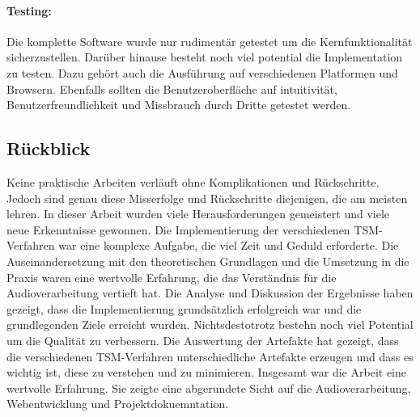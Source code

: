 \paragraph{Testing:}
Die komplette Software wurde nur rudimentär getestet um die Kernfunktionalität sicherzustellen. Darüber hinause besteht noch viel potential die Implementation zu testen. Dazu gehört auch die Ausführung auf verschiedenen Platformen und Browsern. Ebenfalls sollten die Benutzeroberfläche auf intuitivität, Benutzerfreundlichkeit und Missbrauch durch Dritte getestet werden.

\subsection{Rückblick}
Keine praktische Arbeiten verläuft ohne Komplikationen und Rückschritte. Jedoch sind genau diese Misserfolge und Rückschritte diejenigen, die am meisten lehren. In dieser Arbeit wurden viele Herausforderungen gemeistert und viele neue Erkenntnisse gewonnen. Die Implementierung der verschiedenen TSM-Verfahren war eine komplexe Aufgabe, die viel Zeit und Geduld erforderte. Die Auseinandersetzung mit den theoretischen Grundlagen und die Umsetzung in die Praxis waren eine wertvolle Erfahrung, die das Verständnis für die Audioverarbeitung vertieft hat. Die Analyse und Diskussion der Ergebnisse haben gezeigt, dass die Implementierung grundsätzlich erfolgreich war und die grundlegenden Ziele erreicht wurden. Nichtsdestotrotz bestehn noch viel Potential um die Qualität zu verbessern. Die Auswertung der Artefakte hat gezeigt, dass die verschiedenen TSM-Verfahren unterschiedliche Artefakte erzeugen und dass es wichtig ist, diese zu verstehen und zu minimieren. Insgesamt war die Arbeit eine wertvolle Erfahrung. Sie zeigte eine abgerundete Sicht auf die Audioverarbeitung, Webentwicklung und Projektdokuemntation.